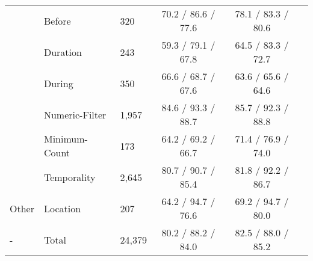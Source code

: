 \begin{tabular}{l l l c c c}
     &                       Before & 320 & 70.2 / 86.6 / 77.6 & 78.1 / 83.3 / 80.6 \\
     &                       Duration & 243 & 59.3 / 79.1 / 67.8 & 64.5 / 83.3 / 72.7 \\
     &                       During & 350 & 66.6 / 68.7 / 67.6 & 63.6 / 65.6 / 64.6 \\
     &                       Numeric-Filter & 1,957 & 84.6 / 93.3 / 88.7 & 85.7 / 92.3 / 88.8 \\
     &                       Minimum-Count & 173 & 64.2 / 69.2 / 66.7 & 71.4 / 76.9 / 74.0 \\
     &                       Temporality & 2,645 & 80.7 / 90.7 / 85.4 & 81.8 / 92.2 / 86.7 \\
    \hline
    Other &                  Location & 207 & 64.2 / 94.7 / 76.6 & 69.2 / 94.7 / 80.0 \\
    \hline
    - & Total & 24,379 & 80.2 / 88.2 / 84.0 & 82.5 / 88.0 / 85.2
\end{tabular}